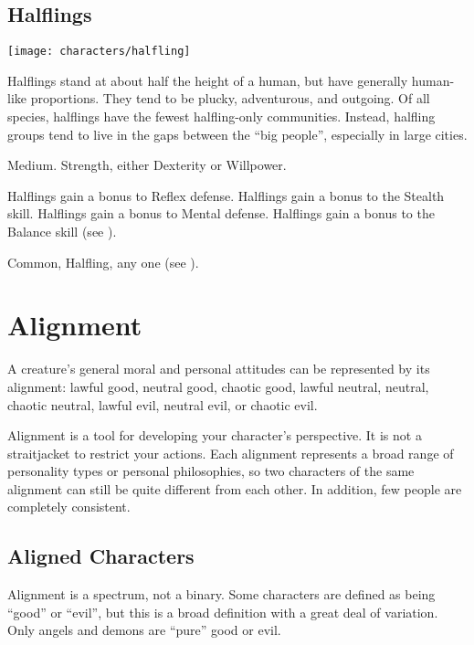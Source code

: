    \subsection{Halflings}
        \texttt{[image: characters/halfling]}

        Halflings stand at about half the height of a human, but have generally human-like proportions.
        They tend to be plucky, adventurous, and outgoing.
        Of all species, halflings have the fewest halfling-only communities.
        Instead, halfling groups tend to live in the gaps between the ``big people'', especially in large cities.

         Medium.
          Strength, either  Dexterity or  Willpower.
        \begin{raggeditemize}
             Halflings gain a  bonus to Reflex defense.
             Halflings gain a  bonus to the Stealth skill.
             Halflings gain a  bonus to Mental defense.
             Halflings gain a  bonus to the Balance skill (see ).
        \end{raggeditemize}
         Common, Halfling, any one  (see ).

\section{Alignment}\label{Alignment}
    A creature's general moral and personal attitudes can be represented by its alignment: lawful good, neutral good, chaotic good, lawful neutral, neutral, chaotic neutral, lawful evil, neutral evil, or chaotic evil.

    Alignment is a tool for developing your character's perspective.
    It is not a straitjacket to restrict your actions.
    Each alignment represents a broad range of personality types or personal philosophies, so two characters of the same alignment can still be quite different from each other.
    In addition, few people are completely consistent.

    \subsection{Aligned Characters}
        Alignment is a spectrum, not a binary.
        Some characters are defined as being ``good'' or ``evil'', but this is a broad definition with a great deal of variation.
        Only angels and demons are ``pure'' good or evil.

